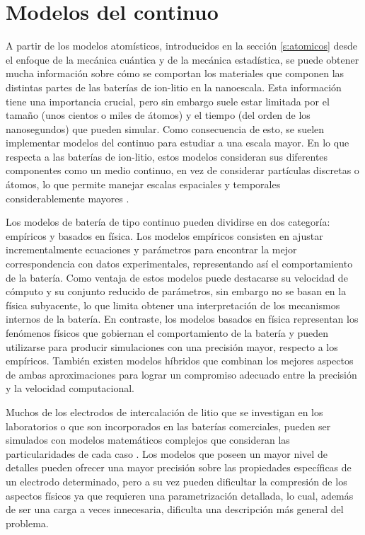 \section{Modelos del continuo}

A partir de los modelos atomísticos, introducidos en la sección \ref{s:atomicos} desde 
el enfoque de la mecánica cuántica y de la mecánica estadística, se puede obtener
mucha información sobre cómo se comportan los materiales que componen las
distintas partes de las baterías de ion-litio en la nanoescala. Esta información 
tiene una importancia crucial, pero sin embargo suele estar limitada por el tamaño
(unos cientos o miles de átomos) y el tiempo (del orden de los nanosegundos) que 
pueden simular. Como consecuencia de esto, se suelen implementar modelos del 
continuo para estudiar a una escala mayor. En lo que respecta a las baterías de 
ion-litio, estos modelos consideran sus diferentes componentes como un medio 
continuo, en vez de considerar partículas discretas o átomos, lo que permite
manejar escalas espaciales y temporales considerablemente mayores \cite{brosa2022}.

Los modelos de batería de tipo continuo pueden dividirse en dos categoría:
empíricos y basados en física. Los modelos empíricos consisten en ajustar 
incrementalmente ecuaciones y parámetros para encontrar la mejor correspondencia
con datos experimentales, representando así el comportamiento de la batería. 
Como ventaja de estos modelos puede destacarse su velocidad de cómputo y su
conjunto reducido de parámetros, sin embargo no se basan en la física subyacente, 
lo que limita obtener una interpretación de los mecanismos internos de la batería.
En contraste, los modelos basados en física representan los fenómenos físicos 
que gobiernan el comportamiento de la batería y pueden utilizarse para producir 
simulaciones con una precisión mayor, respecto a los empíricos. También existen
modelos híbridos que combinan los mejores aspectos de ambas aproximaciones para 
lograr un compromiso adecuado entre la precisión y la velocidad computacional.

Muchos de los electrodos de intercalación de litio que se investigan en los 
laboratorios o que son incorporados en las baterías comerciales, pueden ser 
simulados con modelos matemáticos complejos que consideran las particularidades 
de cada caso \cite{doyle1995}. Los modelos que poseen un mayor nivel de detalles 
pueden ofrecer una mayor precisión sobre las propiedades 
específicas de un electrodo determinado, pero a su vez pueden dificultar la 
compresión de los aspectos físicos ya que requieren una parametrización detallada, 
lo cual, además de ser una carga a veces innecesaria, dificulta una descripción 
más general del problema. 


